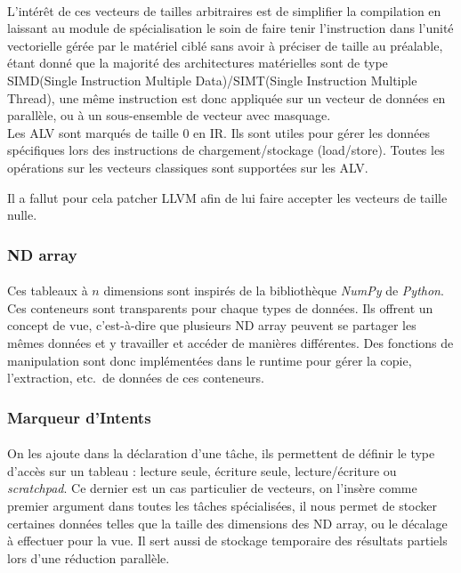 \paragraph{}
L'intérêt de ces vecteurs de tailles arbitraires est de simplifier la
compilation en laissant au module de spécialisation le soin de faire tenir
l'instruction dans l'unité vectorielle gérée par le matériel ciblé sans avoir à
préciser de taille au préalable, étant donné que la majorité des architectures
matérielles sont de type SIMD(Single Instruction Multiple Data)/SIMT(Single
Instruction Multiple Thread), une même instruction est donc appliquée sur un
vecteur de données en parallèle, ou à un sous-ensemble de vecteur avec
masquage.\\
Les ALV sont marqués de taille 0 en IR. Ils sont utiles pour gérer les données
spécifiques lors des instructions de chargement/stockage (load/store). Toutes
les opérations sur les vecteurs classiques sont supportées sur les ALV.

Il a fallut pour cela patcher LLVM afin de lui faire accepter les vecteurs de
taille nulle.

\subsubsection{ND array}
\paragraph{}
Ces tableaux à $n$ dimensions sont inspirés de la bibliothèque \emph{NumPy} de
\emph{Python}. Ces conteneurs sont transparents pour chaque types de données.
Ils offrent un concept de vue, c'est-à-dire que plusieurs ND array peuvent se
partager les mêmes données et y travailler et accéder de manières différentes.
Des fonctions de manipulation sont donc implémentées dans le runtime pour gérer
la copie, l'extraction, etc.\ de données de ces conteneurs.

\subsubsection{Marqueur d'Intents}
\paragraph{}
On les ajoute dans la déclaration d'une tâche, ils permettent de définir le type
d'accès sur un tableau : lecture seule, écriture seule, lecture/écriture ou
\emph{scratchpad}. Ce dernier est un cas particulier de vecteurs, on l'insère
comme premier argument dans toutes les tâches spécialisées, il nous permet de
stocker certaines données telles que la taille des dimensions des ND array, ou
le décalage à effectuer pour la vue. Il sert aussi de stockage temporaire des
résultats partiels lors d'une réduction parallèle.


